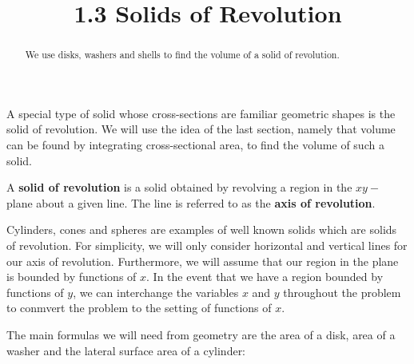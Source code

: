 \documentclass{ximera}
\title{1.3 Solids of Revolution}
\begin{document}
\begin{abstract}
We use disks, washers and shells to find the volume of a solid of revolution.
\end{abstract}

\maketitle

A special type of solid whose cross-sections are familiar geometric shapes is the solid of revolution. 
We will use the idea of the last section, namely that volume can be found by integrating cross-sectional area, 
to find the volume of such a solid.  

\begin{definition} A \textbf{solid of revolution} is a solid obtained by revolving a region in the
 $xy-$ plane about a given line.  The line is referred to as the \textbf{axis of revolution}.
\end{definition}

Cylinders, cones and spheres are examples of well known solids which are solids of revolution. 
For simplicity, we will only consider horizontal and vertical lines for our axis of revolution.  
Furthermore, we will assume that our region in the plane is bounded by functions of $x$.  
In the event that we have a region bounded by functions of $y$, we can interchange the 
variables $x$ and $y$ throughout the problem to conmvert the problem to the setting of functions of $x$.

The main formulas we will need from geometry are the area of a disk, area of a washer and 
the lateral surface area of a cylinder:
\end{document}

